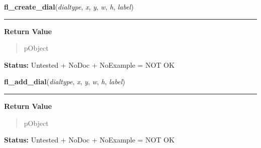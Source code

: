    \label{xformslib:library:fl_create_dial}

    \vspace{0.5ex}

\hspace{.8\funcindent}\begin{boxedminipage}{\funcwidth}

    \raggedright \textbf{fl\_create\_dial}(\textit{dialtype}, \textit{x}, \textit{y}, \textit{w}, \textit{h}, \textit{label})

    \vspace{-1.5ex}

    \rule{\textwidth}{0.5\fboxrule}
\setlength{\parskip}{2ex}
\setlength{\parskip}{1ex}
      \textbf{Return Value}
    \vspace{-1ex}

      \begin{quote}
      pObject

      \end{quote}

\textbf{Status:} Untested + NoDoc + NoExample = NOT OK



    \end{boxedminipage}

    \label{xformslib:library:fl_add_dial}

    \vspace{0.5ex}

\hspace{.8\funcindent}\begin{boxedminipage}{\funcwidth}

    \raggedright \textbf{fl\_add\_dial}(\textit{dialtype}, \textit{x}, \textit{y}, \textit{w}, \textit{h}, \textit{label})

    \vspace{-1.5ex}

    \rule{\textwidth}{0.5\fboxrule}
\setlength{\parskip}{2ex}
\setlength{\parskip}{1ex}
      \textbf{Return Value}
    \vspace{-1ex}

      \begin{quote}
      pObject

      \end{quote}

\textbf{Status:} Untested + NoDoc + NoExample = NOT OK



    \end{boxedminipage}


